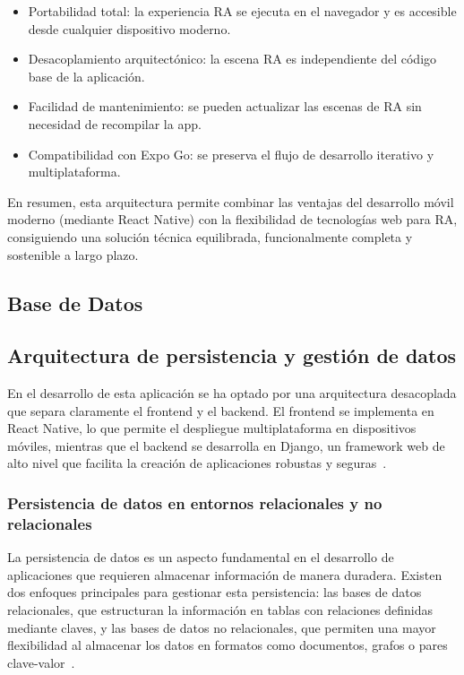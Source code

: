 \begin{itemize}
    \item Portabilidad total: la experiencia RA se ejecuta en el navegador y es accesible desde cualquier dispositivo moderno.
    \item Desacoplamiento arquitectónico: la escena RA es independiente del código base de la aplicación.
    \item Facilidad de mantenimiento: se pueden actualizar las escenas de RA sin necesidad de recompilar la app.
    \item Compatibilidad con Expo Go: se preserva el flujo de desarrollo iterativo y multiplataforma.
\end{itemize}

En resumen, esta arquitectura permite combinar las ventajas del desarrollo móvil moderno (mediante React Native) con la flexibilidad de tecnologías web para RA, consiguiendo una solución técnica equilibrada, funcionalmente completa y sostenible a largo plazo.

\subsection{Base de Datos}

\subsection{Arquitectura de persistencia y gestión de datos}

En el desarrollo de esta aplicación se ha optado por una arquitectura desacoplada que separa claramente el frontend y el backend. El frontend se implementa en React Native, lo que permite el despliegue multiplataforma en dispositivos móviles, mientras que el backend se desarrolla en Django, un framework web de alto nivel que facilita la creación de aplicaciones robustas y seguras~\cite{django2024}.

\subsubsection{Persistencia de datos en entornos relacionales y no relacionales}

La persistencia de datos es un aspecto fundamental en el desarrollo de aplicaciones que requieren almacenar información de manera duradera. Existen dos enfoques principales para gestionar esta persistencia: las bases de datos relacionales, que estructuran la información en tablas con relaciones definidas mediante claves, y las bases de datos no relacionales, que permiten una mayor flexibilidad al almacenar los datos en formatos como documentos, grafos o pares clave-valor~\cite{elmasri2017}. 

